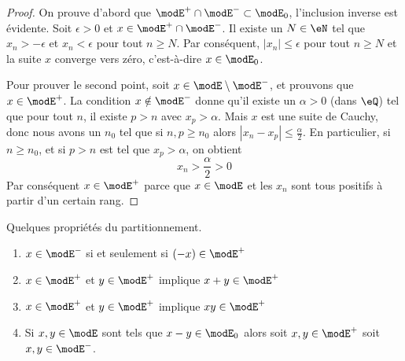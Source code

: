 \begin{proof}
    On prouve d'abord que \( \modE^+\cap\modE^-\subset\modE_0\), l'inclusion inverse est évidente. Soit \( \epsilon>0\) et \( x\in \modE^+\cap\modE^-\). Il existe un \( N\in \eN\) tel que \( x_n>-\epsilon\) et \( x_n<\epsilon\) pour tout \( n\geq N\). Par conséquent, \( | x_n |\leq \epsilon\) pour tout \( n\geq N\) et la suite \( x\) converge vers zéro, c'est-à-dire \( x\in\modE_0\).

    Pour prouver le second point, soit \( x\in \modE\setminus\modE^-\), et prouvons que \( x\in\modE^+\). La condition \( x\notin \modE^-\) donne qu'il existe un \( \alpha>0\) (dans \( \eQ\)) tel que pour tout \( n\), il existe \( p>n\) avec \( x_p>\alpha\). Mais \( x\) est une suite de Cauchy, donc nous avons un \( n_0\) tel que si \( n,p\geq n_0\) alors \( | x_n-x_p |\leq \frac{ \alpha }{2}\). En particulier, si \( n\geq n_0\), et si \( p>n\) est tel que \( x_p>\alpha\), on obtient
    \begin{equation}
        x_n>\frac{ \alpha }{2}>0
    \end{equation}
    Par conséquent \( x\in\modE^+\) parce que \( x\in\modE\) et les \( x_n \) sont tous positifs à partir d'un certain rang.
\end{proof}

\begin{lemma}
    Quelques propriétés du partitionnement.
    \begin{enumerate}
        \item
            \( x\in\modE^-\) si et seulement si \( (-x)\in\modE^+\)
        \item
            \( x\in\modE^+\) et \( y\in\modE^+\) implique \( x+y\in\modE^+\)
        \item
            \( x\in\modE^+\) et \( y\in\modE^+\) implique \( xy\in\modE^+\)
        \item
            Si \( x,y\in\modE\) sont tels que \( x-y\in\modE_0\) alors soit \( x,y\in\modE^+\) soit \( x,y\in\modE^-\).
    \end{enumerate}
\end{lemma}

